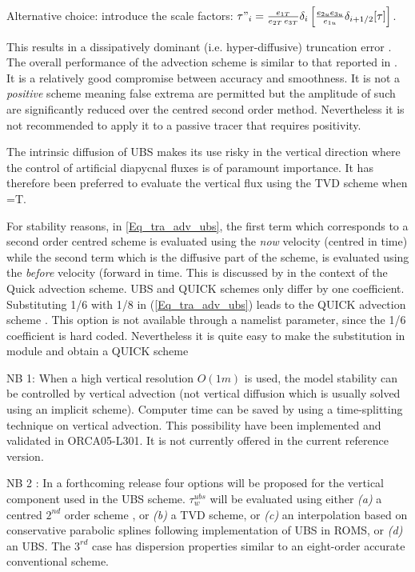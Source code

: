 Alternative choice: introduce the scale factors:  
$\tau "_i =\frac{e_{1T}}{e_{2T}\,e_{3T}}\delta _i \left[ \frac{e_{2u} e_{3u} }{e_{1u} }\delta _{i+1/2}[\tau] \right]$.


This results in a dissipatively dominant (i.e. hyper-diffusive) truncation 
error \citep{Shchepetkin_McWilliams_OM05}. The overall performance of the 
advection scheme is similar to that reported in \cite{Farrow1995}. 
It is a relatively good compromise between accuracy and smoothness. It is 
not a \emph{positive} scheme meaning false extrema are permitted but the 
amplitude of such are significantly reduced over the centred second order 
method. Nevertheless it is not recommended to apply it to a passive tracer 
that requires positivity. 

The intrinsic diffusion of UBS makes its use risky in the vertical direction 
where the control of artificial diapycnal fluxes is of paramount importance. 
It has therefore been preferred to evaluate the vertical flux using the TVD 
scheme when =T.

For stability reasons, in \eqref{Eq_tra_adv_ubs}, the first term which corresponds 
to a second order centred scheme is evaluated using the \textit{now} velocity 
(centred in time) while the second term which is the diffusive part of the scheme, 
is evaluated using the \textit{before} velocity (forward in time. This is discussed 
by \citet{Webb_al_JAOT98} in the context of the Quick advection scheme. UBS and QUICK 
schemes only differ by one coefficient. Substituting 1/6 with 1/8 in 
(\ref{Eq_tra_adv_ubs}) leads to the QUICK advection scheme \citep{Webb_al_JAOT98}. 
This option is not available through a namelist parameter, since the 1/6 
coefficient is hard coded. Nevertheless it is quite easy to make the 
substitution in  module and obtain a QUICK scheme

NB 1: When a high vertical resolution $O(1m)$ is used, the model stability can 
be controlled by vertical advection (not vertical diffusion which is usually 
solved using an implicit scheme). Computer time can be saved by using a 
time-splitting technique on vertical advection. This possibility have been 
implemented and validated in ORCA05-L301. It is not currently offered in the 
current reference version. 

NB 2 : In a forthcoming release four options will be proposed for the 
vertical component used in the UBS scheme. $\tau _w^{ubs}$ will be 
evaluated using either \textit{(a)} a centred $2^{nd}$ order scheme , 
or  \textit{(b)} a TVD scheme, or  \textit{(c)} an interpolation based on conservative 
parabolic splines following \citet{Shchepetkin_McWilliams_OM05} implementation of UBS in ROMS, 
or  \textit{(d)} an UBS. The $3^{rd}$ case has dispersion properties similar to an 
eight-order accurate conventional scheme.

